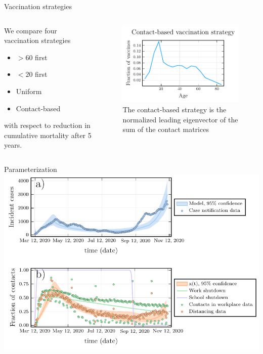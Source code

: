 \documentclass{beamer}
\begin{document}
\begin{frame}{Vaccination strategies}
    \begin{columns}
        \begin{column}{0.5\textwidth}
            We compare four vaccination strategies
            \begin{itemize}
                \item $>60$ first
                \item $<20$ first
                \item Uniform
                \item Contact-based
            \end{itemize}
            with respect to reduction in cumulative mortality after 5 years.
        \end{column}
        \begin{column}{0.5\textwidth}
        \begin{figure}
            \includegraphics[width = \textwidth]{leading_eigenvector.pdf}
            \caption{  The contact-based strategy is the normalized leading eigenvector of the sum of the contact matrices}
        \end{figure}
        \end{column}
    \end{columns}
\end{frame}
\begin{frame}{Parameterization}
    \includegraphics[width=\textwidth]{covid/plot_model.pdf}
\end{frame}
\end{document}
